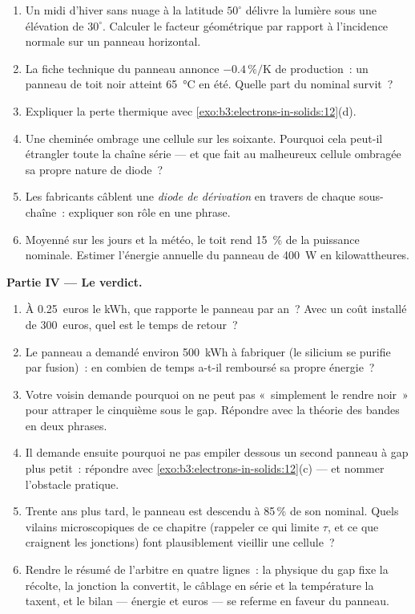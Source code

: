 \begin{problem}
\begin{enumerate}[resume]
  \item Un midi d'hiver sans nuage à la latitude $50^\circ$ délivre
        la lumière sous une élévation de $30^\circ$. Calculer le
        facteur géométrique par rapport à l'incidence normale sur un
        panneau horizontal.
  \item La fiche technique du panneau annonce
        $-0.4\,\%/\text{K}$ de production~: un panneau de toit noir
        atteint \qty{65}{\celsius} en été. Quelle part du nominal
        survit~?
  \item Expliquer la perte thermique avec
        \cref{exo:b3:electrons-in-solids:12}(d).
  \item Une cheminée ombrage une cellule sur les soixante. Pourquoi
        cela peut-il étrangler toute la chaîne série --- et que fait
        au malheureux cellule ombragée sa propre nature de diode~?
  \item Les fabricants câblent une \emph{diode de dérivation} en
        travers de chaque sous-chaîne~: expliquer son rôle en une
        phrase.
  \item Moyenné sur les jours et la météo, le toit rend
        \qty{15}{\percent} de la puissance nominale. Estimer
        l'énergie annuelle du panneau de \qty{400}{W} en
        kilowattheures.
\end{enumerate}

\medskip\noindent\textbf{Partie IV --- Le verdict.}

\begin{enumerate}[resume]
  \item À \qty{0.25}{euros} le kWh, que rapporte le panneau par
        an~? Avec un coût installé de \qty{300}{euros}, quel est le
        temps de retour~?
  \item Le panneau a demandé environ \qty{500}{kWh} à fabriquer (le
        silicium se purifie par fusion)~: en combien de temps a-t-il
        remboursé sa propre énergie~?
  \item Votre voisin demande pourquoi on ne peut pas
        «~simplement le rendre noir~» pour attraper le cinquième
        sous le gap. Répondre avec la théorie des bandes en deux
        phrases.
  \item Il demande ensuite pourquoi ne pas empiler dessous un
        second panneau à gap plus petit~: répondre avec
        \cref{exo:b3:electrons-in-solids:12}(c) --- et nommer
        l'obstacle pratique.
  \item Trente ans plus tard, le panneau est descendu à 85\,\% de
        son nominal. Quels vilains microscopiques de ce chapitre
        (rappeler ce qui limite $\tau$, et ce que craignent les
        jonctions) font plausiblement vieillir une cellule~?
  \item Rendre le résumé de l'arbitre en quatre lignes~: la
        physique du gap fixe la récolte, la jonction la convertit,
        le câblage en série et la température la taxent, et le
        bilan --- énergie et euros --- se referme en faveur du
        panneau.
\end{enumerate}
\end{problem}
